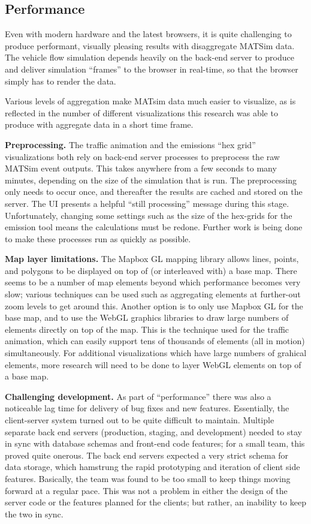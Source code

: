 \hypertarget{mathub-performance}{%
\subsection{Performance}\label{performance}}

Even with modern hardware and the latest browsers, it is quite challenging to produce performant, visually pleasing results with disaggregate MATSim data. The vehicle flow simulation depends heavily on the back-end server to produce and deliver simulation ``frames'' to the browser in real-time, so that the browser simply has to render the data.

Various levels of aggregation make MATsim data much easier to visualize, as is reflected in the number of different visualizations this research was able to produce with aggregate data in a short time frame.

\textbf{Preprocessing.} The traffic animation and the emissions ``hex grid'' visualizations both rely on back-end server processes to preprocess the raw MATSim event outputs. This takes anywhere from a few seconds to many minutes, depending on the size of the simulation that is run. The preprocessing only needs to occur once, and thereafter the results are cached and stored on the server. The UI presents a helpful ``still processing'' message during this stage. Unfortunately, changing some settings such as the size of the hex-grids for the emission tool means the calculations must be redone. Further work is being done to make these processes run as quickly as possible.

\textbf{Map layer limitations.} The Mapbox GL mapping library allows lines, points, and polygons to be displayed on top of (or interleaved with) a base map. There seems to be a number of map elements beyond which performance becomes very slow; various techniques can be used such as aggregating elements at further-out zoom levels to get around this. Another option is to only use Mapbox GL for the base map, and to use the WebGL graphics libraries to draw large numbers of elements directly on top of the map. This is the technique used for the traffic animation, which can easily support tens of thousands of elements (all in motion) simultaneously. For additional visualizations which have large numbers of grahical elements, more research will need to be done to layer WebGL elements on top of a base map.

\textbf{Challenging development.} As part of ``performance'' there was also a noticeable lag time for delivery of bug fixes and new features. Essentially, the client-server system turned out to be quite difficult to maintain. Multiple separate back end servers (production, staging, and development) needed to stay in sync with database schemas and front-end code features; for a small team, this proved quite onerous. The back end servers expected a very strict schema for data storage, which hamstrung the rapid prototyping and iteration of client side features. Basically, the team was found to be too small to keep things moving forward at a regular pace. This was not a problem in either the design of the server code or the features planned for the clients; but rather, an inability to keep the two in sync.

